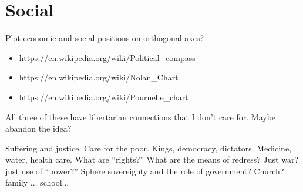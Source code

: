 \documentclass[12pt]{article}
\begin{document}




\section{Social}
\label{sec:social}

Plot economic and social positions on orthogonal axes?
\begin{itemize}
\item{https://en.wikipedia.org/wiki/Political\_compass}
\item{https://en.wikipedia.org/wiki/Nolan\_Chart}
\item{https://en.wikipedia.org/wiki/Pournelle\_chart}
\end{itemize}
All three of these have libertarian connections that I don't care for. Maybe abandon the idea?

Suffering and justice. Care for the poor. 
Kings, democracy, dictators.
Medicine, water, health care. What are ``rights?''
What are the means of redress?
Just war? just use of ``power?''
Sphere sovereignty and the role of government? Church? family ... school...
\end{document}
